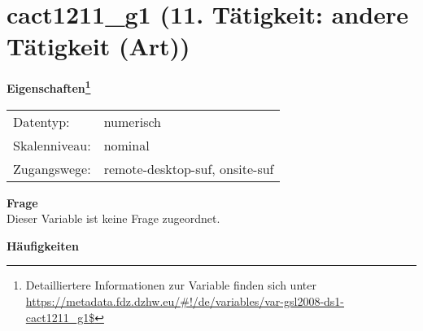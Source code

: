 
    \setcounter{footnote}{0}

    \vspace*{-1.8cm}
	\section{cact1211\_g1 (11. Tätigkeit: andere Tätigkeit (Art))}
	\label{section:cact1211_g1}



    \vspace*{0.5cm}
    \noindent\textbf{Eigenschaften\footnote{Detailliertere Informationen zur Variable finden sich unter
		\url{https://metadata.fdz.dzhw.eu/\#!/de/variables/var-gsl2008-ds1-cact1211_g1$}}}\\
	\begin{tabularx}{\hsize}{@{}lX}
	Datentyp: & numerisch \\
	Skalenniveau: & nominal \\
	Zugangswege: &
	  remote-desktop-suf, 
	  onsite-suf
 \\
    \end{tabularx}



		\vspace*{0.5cm}
		\noindent\textbf{Frage}\\
		Dieser Variable ist keine Frage zugeordnet.





        		\vspace*{0.5cm}
                \noindent\textbf{Häufigkeiten}

